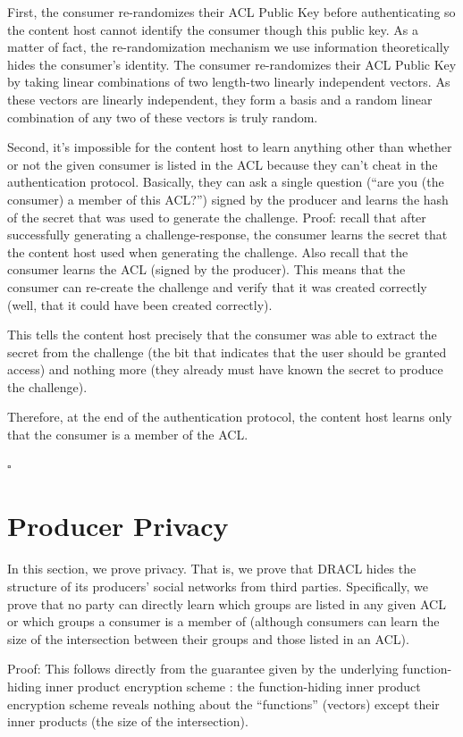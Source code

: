 \documentclass[pdftex,12pt,a4papaer,twoside,notitlepage]{report}
\begin{document}
\begin{appendices}
First, the consumer re-randomizes their ACL Public Key before authenticating so
the content host cannot identify the consumer though this public key. As a
matter of fact, the re-randomization mechanism we use information theoretically
hides the consumer's identity. The consumer re-randomizes their ACL Public Key
by taking linear combinations of two length-two linearly independent vectors. As
these vectors are linearly independent, they form a basis and a random linear
combination of any two of these vectors is truly random.

Second, it's impossible for the content host to learn anything other than
whether or not the given consumer is listed in the ACL because they can't cheat
in the authentication protocol. Basically, they can ask a single question (``are
you (the consumer) a member of this ACL?'') signed by the producer and learns
the hash of the secret that was used to generate the challenge. Proof: recall
that after successfully generating a challenge-response, the consumer learns the
secret that the content host used when generating the challenge. Also recall
that the consumer learns the ACL (signed by the producer). This means that the
consumer can re-create the challenge and verify that it was created correctly
(well, that it could have been created correctly).

This tells the content host precisely that the consumer was able to extract the
secret from the challenge (the bit that indicates that the user should be
granted access) and nothing more (they already must have known the secret to
produce the challenge).

Therefore, at the end of the authentication protocol, the content host learns
only that the consumer is a member of the ACL.

{\hfill $\square$}

\section{Producer Privacy}

In this section, we prove privacy. That is, we prove that DRACL hides the
structure of its producers' social networks from third parties. Specifically, we
prove that no party can directly learn which groups are listed in any given ACL or
which groups a consumer is a member of (although consumers can learn the size of
the intersection between their groups and those listed in an ACL).

Proof: This follows directly from the guarantee given by the underlying
function-hiding inner product encryption scheme \cite{inner-product}: the
function-hiding inner product encryption scheme reveals nothing about the
``functions'' (vectors) except their inner products (the size of the
intersection).


\end{appendices}
\end{document}
